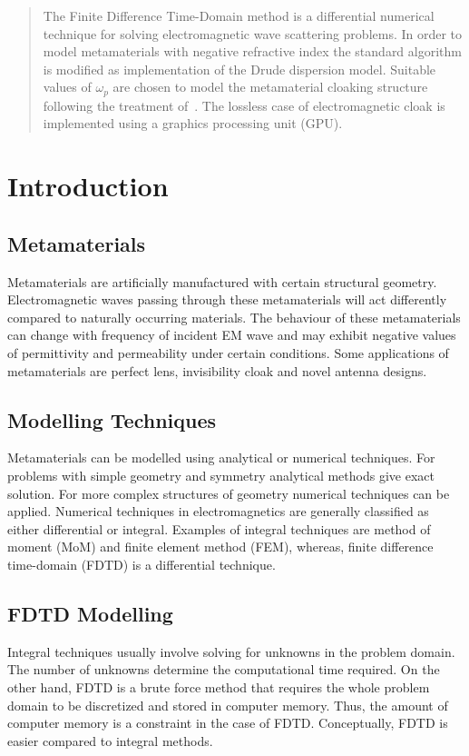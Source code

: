 \documentclass{report}
\begin{document}


\tableofcontents
\listoffigures

\begin{abstract}
The Finite Difference Time-Domain method is a differential numerical technique for solving electromagnetic wave scattering problems. In order to model metamaterials with negative refractive index the standard algorithm is modified as implementation of the Drude dispersion model. Suitable values of $\omega_p$  are chosen to model the metamaterial cloaking structure following the treatment of~\cite{Radial-Zhao}. The lossless case of electromagnetic cloak is implemented using a graphics processing unit (GPU).
\end{abstract}

\chapter{Introduction}
\section{Metamaterials}
Metamaterials are artificially manufactured with certain structural geometry. Electromagnetic waves passing through these metamaterials will act differently compared to naturally occurring materials. The behaviour of these metamaterials can change with frequency of incident EM wave and may exhibit negative values of permittivity and permeability under certain conditions. Some applications of metamaterials are perfect lens, invisibility cloak and novel antenna designs.

\section{Modelling Techniques}
Metamaterials can be modelled using analytical or numerical techniques. For problems with simple geometry and symmetry analytical methods give exact solution. For more complex structures of geometry numerical techniques can be applied. Numerical techniques in electromagnetics are generally classified as either differential or integral. Examples of integral techniques are method of moment (MoM) and finite element method (FEM), whereas, finite difference time-domain (FDTD) is a differential technique.

\section{FDTD Modelling}
Integral techniques usually involve solving for unknowns in the problem domain. The number of unknowns determine the computational time required. On the other hand, FDTD is a brute force method that requires the whole problem domain to be discretized and stored in computer memory. Thus, the amount of computer memory is a constraint in the case of FDTD. Conceptually, FDTD is easier compared to integral methods.
\end{document}
